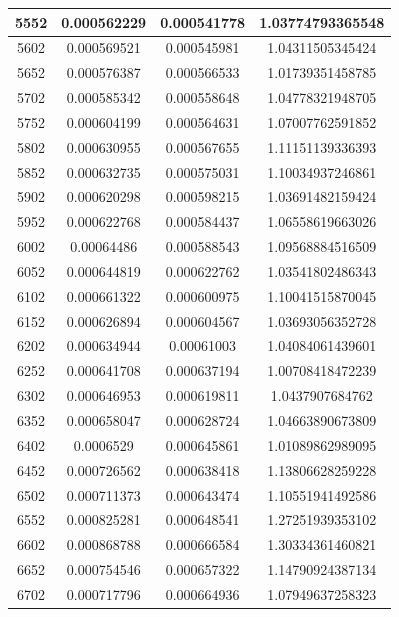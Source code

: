 \documentclass{article}
\begin{document}
\begin{longtable}{|c|c|c|c|}
		5552	&   0.000562229	  & 0.000541778	 &  1.03774793365548   \\ \hline
		5602	&   0.000569521	  & 0.000545981	 &  1.04311505345424   \\ \hline
		5652	&   0.000576387	  & 0.000566533	 &  1.01739351458785   \\ \hline
		5702	&   0.000585342	  & 0.000558648	 &  1.04778321948705   \\ \hline
		5752	&   0.000604199	  & 0.000564631	 &  1.07007762591852   \\ \hline
		5802	&   0.000630955	  & 0.000567655	 &  1.11151139336393   \\ \hline
		5852	&   0.000632735	  & 0.000575031	 &  1.10034937246861   \\ \hline
		5902	&   0.000620298	  & 0.000598215	 &  1.03691482159424   \\ \hline
		5952	&   0.000622768	  & 0.000584437	 &  1.06558619663026   \\ \hline
		6002	&   0.00064486	  & 0.000588543	 &  1.09568884516509   \\ \hline
		6052	&   0.000644819	  & 0.000622762	 &  1.03541802486343   \\ \hline
		6102	&   0.000661322	  & 0.000600975	 &  1.10041515870045   \\ \hline
		6152	&   0.000626894	  & 0.000604567	 &  1.03693056352728   \\ \hline
		6202	&   0.000634944	  & 0.00061003	 &  1.04084061439601   \\ \hline
		6252	&   0.000641708	  & 0.000637194	 &  1.00708418472239   \\ \hline
		6302	&   0.000646953	  & 0.000619811	 &  1.0437907684762   \\ \hline
		6352	&   0.000658047	  & 0.000628724	 &  1.04663890673809   \\ \hline
		6402	&   0.0006529	  & 0.000645861	 &  1.01089862989095   \\ \hline
		6452	&   0.000726562	  & 0.000638418	 &  1.13806628259228   \\ \hline
		6502	&   0.000711373	  & 0.000643474	 &  1.10551941492586   \\ \hline
		6552	&   0.000825281	  & 0.000648541	 &  1.27251939353102   \\ \hline
		6602	&   0.000868788	  & 0.000666584	 &  1.30334361460821   \\ \hline
		6652	&   0.000754546	  & 0.000657322	 &  1.14790924387134   \\ \hline
		6702	&   0.000717796	  & 0.000664936	 &  1.07949637258323   \\ \hline

\end{longtable}
\end{document}
